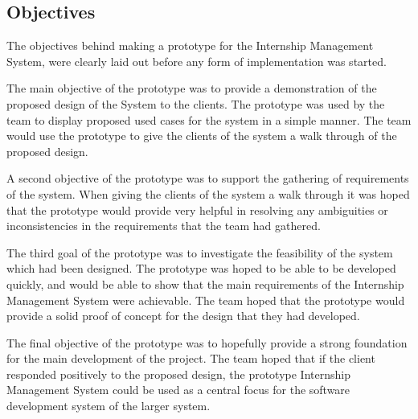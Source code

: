 \subsection{Objectives}

The objectives behind making a prototype for the Internship Management System, were clearly laid out before any form of implementation was started.


The main objective of the prototype was to provide a demonstration of the proposed design of the System to the clients. The prototype was used by the team to display proposed used cases for the system in a simple manner.
The team would use the prototype to give the clients of the system a walk through of the proposed design.


A second objective of the prototype was to support the gathering of requirements of the system. When giving the clients of the system a walk through it was hoped that the prototype would provide very helpful in resolving any ambiguities or inconsistencies in the requirements that the team had gathered.


The third goal of the prototype was to investigate the feasibility of the system which had been designed. The prototype was hoped to be able to be developed quickly, and would be able to show that the main requirements of the Internship Management System were achievable. The team hoped that the prototype would provide a solid proof of concept for the design that they had developed.


The final objective of the prototype was to hopefully provide a strong foundation for the main development of the project. The team hoped that if the client responded positively to the proposed design, the prototype Internship Management System could be used as a central focus for the software development system of the larger system.
